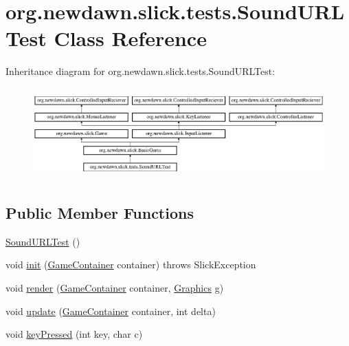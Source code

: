 \hypertarget{classorg_1_1newdawn_1_1slick_1_1tests_1_1_sound_u_r_l_test}{}\section{org.\+newdawn.\+slick.\+tests.\+Sound\+U\+R\+L\+Test Class Reference}
\label{classorg_1_1newdawn_1_1slick_1_1tests_1_1_sound_u_r_l_test}
Inheritance diagram for org.\+newdawn.\+slick.\+tests.\+Sound\+U\+R\+L\+Test\+:\begin{figure}[H]
\begin{center}
\leavevmode
\includegraphics[height=3.522012cm]{classorg_1_1newdawn_1_1slick_1_1tests_1_1_sound_u_r_l_test}
\end{center}
\end{figure}
\subsection*{Public Member Functions}
\begin{DoxyCompactItemize}
\item 
\mbox{\hyperlink{classorg_1_1newdawn_1_1slick_1_1tests_1_1_sound_u_r_l_test_ae74c5053ad1b41a8f07d57a50c70beea}{Sound\+U\+R\+L\+Test}} ()
\item 
void \mbox{\hyperlink{classorg_1_1newdawn_1_1slick_1_1tests_1_1_sound_u_r_l_test_afa11133bb3ebed039640c909710a4a84}{init}} (\mbox{\hyperlink{classorg_1_1newdawn_1_1slick_1_1_game_container}{Game\+Container}} container)  throws Slick\+Exception 
\item 
void \mbox{\hyperlink{classorg_1_1newdawn_1_1slick_1_1tests_1_1_sound_u_r_l_test_aa18c580ddd0f25c984afaaad050b7200}{render}} (\mbox{\hyperlink{classorg_1_1newdawn_1_1slick_1_1_game_container}{Game\+Container}} container, \mbox{\hyperlink{classorg_1_1newdawn_1_1slick_1_1_graphics}{Graphics}} g)
\item 
void \mbox{\hyperlink{classorg_1_1newdawn_1_1slick_1_1tests_1_1_sound_u_r_l_test_ad0e6dca29bc3052812af2834f4184431}{update}} (\mbox{\hyperlink{classorg_1_1newdawn_1_1slick_1_1_game_container}{Game\+Container}} container, int delta)
\item 
void \mbox{\hyperlink{classorg_1_1newdawn_1_1slick_1_1tests_1_1_sound_u_r_l_test_a457ceb805590c0e539de1e1af83da51d}{key\+Pressed}} (int key, char c)
\end{DoxyCompactItemize}
